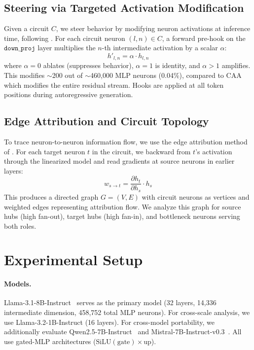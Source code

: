 \documentclass[11pt]{article}
\begin{document}
\subsection{Steering via Targeted Activation Modification}
\label{sec:steering}

Given a circuit $C$, we steer behavior by modifying neuron activations at inference time, following \citet{arora2025circuits}.
For each circuit neuron $(l, n) \in C$, a forward pre-hook on the $\texttt{down\_proj}$ layer multiplies the $n$-th intermediate activation by a scalar $\alpha$:
\begin{equation}
    h'_{l,n} = \alpha \cdot h_{l,n}
\end{equation}
where $\alpha = 0$ ablates (suppresses behavior), $\alpha = 1$ is identity, and $\alpha > 1$ amplifies.
This modifies ${\sim}$200 out of ${\sim}$460,000 MLP neurons (0.04\%), compared to CAA which modifies the entire residual stream.
Hooks are applied at all token positions during autoregressive generation.

\subsection{Edge Attribution and Circuit Topology}
\label{sec:edges}

To trace neuron-to-neuron information flow, we use the edge attribution method of \citet{arora2025circuits}.
For each target neuron $t$ in the circuit, we backward from $t$'s activation through the linearized model and read gradients at source neurons in earlier layers:
\begin{equation}
    w_{s \to t} = \frac{\partial h_t}{\partial h_s} \cdot h_s
\end{equation}
This produces a directed graph $G = (V, E)$ with circuit neurons as vertices and weighted edges representing attribution flow.
We analyze this graph for source hubs (high fan-out), target hubs (high fan-in), and bottleneck neurons serving both roles.


\section{Experimental Setup}
\label{sec:setup}

\paragraph{Models.}
Llama-3.1-8B-Instruct~\citep{dubey2024llama3} serves as the primary model (32 layers, 14,336 intermediate dimension, 458,752 total MLP neurons).
For cross-scale analysis, we use Llama-3.2-1B-Instruct (16 layers).
For cross-model portability, we additionally evaluate Qwen2.5-7B-Instruct~\citep{yang2024qwen2} and Mistral-7B-Instruct-v0.3~\citep{jiang2023mistral}.
All use gated-MLP architectures ($\text{SiLU}(\text{gate}) \times \text{up}$).
\end{document}
